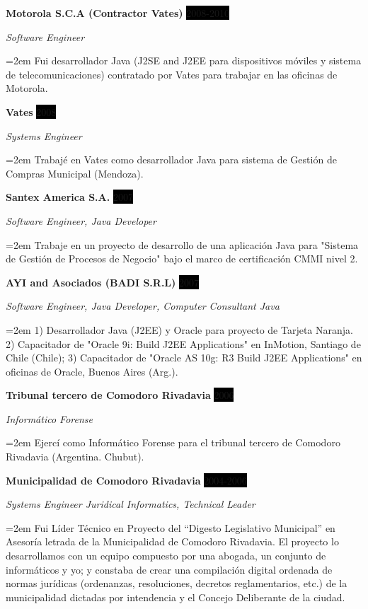 \documentclass[paper=a4,fontsize=11pt]{scrartcl} %
\newcommand{\sepspace}{\vspace*{1em}}		%
\newcommand{\EducationEntry}[4]{
		\noindent \textbf{#1} \hfill      %
		\colorbox{Black}{%
			\parbox{6em}{%
			\hfill\color{White}#2}} \par  %
		\noindent \textit{#3} \par        %
		\noindent\hangindent=2em\hangafter=0 \small #4 %
		\normalsize \par}
\newcommand{\WorkEntry}[4]{				  %
		\noindent \textbf{#1} \hfill      %
		\colorbox{Black}{\color{White}#2} \par  %
		\noindent \textit{#3} \par              %
		\noindent\hangindent=2em\hangafter=0 \small #4 %
		\normalsize \par}
\begin{document}
\sepspace

\WorkEntry{Motorola S.C.A (Contractor Vates)}{2008-2010}{Software Engineer}
{Fui desarrollador Java (J2SE and J2EE para dispositivos móviles y sistema de telecomunicaciones) contratado por Vates para trabajar en las oficinas de Motorola.}

\sepspace

\WorkEntry{Vates}{2008}{Systems Engineer}
{Trabajé en Vates como desarrollador Java para sistema de Gestión de Compras Municipal (Mendoza).}

\sepspace

\WorkEntry{Santex America S.A.}{2007}{Software Engineer, Java Developer}
{Trabaje en un proyecto de desarrollo de una aplicación Java para "Sistema de Gestión de Procesos de Negocio" bajo el marco de certificación CMMI nivel 2.}

\sepspace

\WorkEntry{AYI and Asociados (BADI S.R.L)}{2007}{Software Engineer, Java Developer, Computer Consultant Java}
{1) Desarrollador Java (J2EE) y Oracle para proyecto de Tarjeta Naranja.
2) Capacitador de "Oracle 9i: Build J2EE Applications" en InMotion, Santiago de Chile (Chile);
3) Capacitador de "Oracle AS 10g: R3 Build J2EE Applications" en oficinas de Oracle, Buenos Aires (Arg.).
}

\sepspace

\WorkEntry{Tribunal tercero de Comodoro Rivadavia}{2006}{Informático Forense}{
Ejercí como Informático Forense para el tribunal tercero de Comodoro Rivadavia (Argentina. Chubut).}

\sepspace

\WorkEntry{Municipalidad de Comodoro Rivadavia}{2004-2006}{Systems Engineer Juridical Informatics, Technical Leader}
{Fui Líder Técnico en Proyecto del “Digesto Legislativo Municipal” en Asesoría letrada de la Municipalidad de Comodoro Rivadavia. El proyecto lo desarrollamos con un equipo compuesto por una abogada, un conjunto de informáticos y yo; y constaba de crear una compilación digital ordenada de normas jurídicas (ordenanzas, resoluciones, decretos reglamentarios, etc.) de la municipalidad dictadas por intendencia y el Concejo Deliberante de la ciudad.
}
\end{document}
